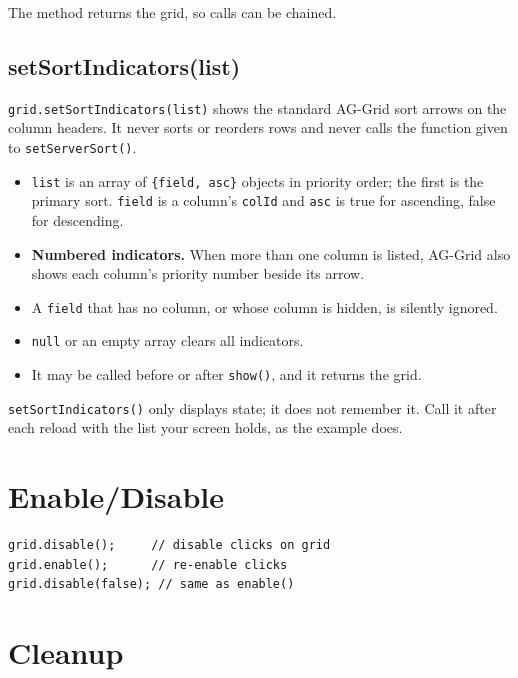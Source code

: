 The method returns the grid, so calls can be chained.

\subsection{setSortIndicators(list)}

\texttt{grid.setSortIndicators(list)} shows the standard AG-Grid sort arrows on the column headers.  It never sorts or reorders rows and never calls the function given to \texttt{setServerSort()}.

\begin{itemize}
  \item \texttt{list} is an array of \texttt{\{field, asc\}} objects in priority order; the first is the primary sort.  \texttt{field} is a column's \texttt{colId} and \texttt{asc} is true for ascending, false for descending.
  \item \textbf{Numbered indicators.}  When more than one column is listed, AG-Grid also shows each column's priority number beside its arrow.
  \item A \texttt{field} that has no column, or whose column is hidden, is silently ignored.
  \item \texttt{null} or an empty array clears all indicators.
  \item It may be called before or after \texttt{show()}, and it returns the grid.
\end{itemize}

\begin{notebox}
\texttt{setSortIndicators()} only displays state; it does not remember it.  Call it after each reload with the list your screen holds, as the example does.
\end{notebox}

\section{Enable/Disable}
\label{sec:grid-enable}

\begin{lstlisting}[style=javascript]
grid.disable();     // disable clicks on grid
grid.enable();      // re-enable clicks
grid.disable(false); // same as enable()
\end{lstlisting}

\section{Cleanup}
\label{sec:grid-cleanup}

